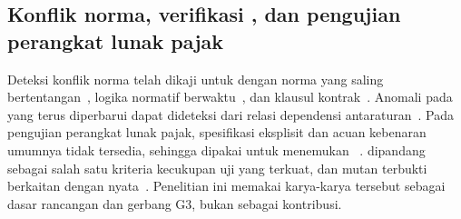 \subsection{Konflik norma, verifikasi , dan pengujian perangkat lunak pajak}
\label{subsec:konflik-uji}

Deteksi konflik norma telah dikaji untuk  dengan norma yang saling bertentangan~\cite{robaldo2024compliance}, logika normatif berwaktu~\cite{kharraz2024conflicts}, dan klausul kontrak~\cite{khoja2026consistency}. Anomali pada  yang terus diperbarui dapat dideteksi dari relasi dependensi antaraturan~\cite{boujelben2025anomalies}. Pada pengujian perangkat lunak pajak, spesifikasi eksplisit dan acuan kebenaran umumnya tidak tersedia, sehingga  dipakai untuk menemukan ~\cite{tizpaz2023metamorphic,li2025mrgeneration}.  dipandang sebagai salah satu kriteria kecukupan uji yang terkuat, dan mutan terbukti berkaitan dengan  nyata~\cite{petrovic2021mutation,petrovic2022mutation}. Penelitian ini memakai karya-karya tersebut sebagai dasar rancangan  dan gerbang G3, bukan sebagai kontribusi.

